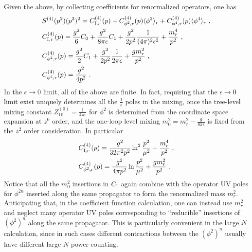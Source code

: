 \documentclass[a4paper,11pt]{article}
\begin{document}
Given the above, by collecting coefficients for renormalized operators, one has 
\begin{align}
&S^{(4)}(p^2)(p^2)^2=C_{{\rm I},r}^{(4)}(p)+C_{\phi^2,r}^{(4)}(p)\langle \phi^2\rangle_r+C_{\phi^4,r}^{(4)}(p)\langle \phi^4\rangle_r \ , \\ 
&C_{{\rm I},r}^{(4)}(p)=\frac{g^2}{6}C_0+\frac{g^2}{8\pi \epsilon}C_1+\frac{g^2}{2p^2}\frac{1}{(4\pi)^2\epsilon^2}+\frac{m_r^4}{p^2} \ , \\
&C_{\phi^2,r}^{(4)}(p)=\frac{g^2}{2}C_1+\frac{g^2}{2p^2}\frac{1}{2\pi \epsilon}+\frac{gm_r^2}{p^2} \ , \\
&C_{\phi^4,r}^{(4)}(p)=\frac{g^2}{4p^2} \ . 
\end{align}
In the $\epsilon \rightarrow 0$ limit, all of the above are finite. In fact, requiring that the $\epsilon \rightarrow 0$ limit exist uniquely determines all the $\frac{1}{\epsilon}$ poles in the mixing, once the tree-level mixing constant $Z_{10}^{(0)}=\frac{1}{4\pi \epsilon}$ for $\phi^2$ is determined from the coordinate space expansion at $z^0$ order, and the one-loop level mixing $m_0^2=m_r^2-\frac{g}{8\pi\epsilon}$ is fixed from the $z^2$ order consideration. In particular
\begin{align}
& C_{{\rm I},r}^{(4)}(p)=\frac{g^2}{32\pi^2 p^2}\ln^2 \frac{p^2}{\mu^2}+\frac{m_r^4}{p^2} \ , \\
& C_{\phi^2,r}^{(4)}(p)=\frac{g^2}{4\pi p^2}\ln \frac{p^2}{\mu^2}+\frac{gm_r^2}{p^2} \ . 
\end{align}
Notice that all the $m_0^2$ insertions in $C_{\rm I}$ again combine with the operator UV poles for $\phi^{2n}$ inserted along the same propagator to form the renormalized mass $m_r^2$. Anticipating that, in the coefficient function calculation, one can instead use $m_r^2$ and neglect many operator UV poles corresponding to ``reducible'' insertions of $(\phi^2)^n$ along the same propagator. This is particularly convenient in the large $N$ calculation, since in such cases different contractions between the $(\phi^{2})^n$ usually have different large $N$ power-counting. 
\end{document}
